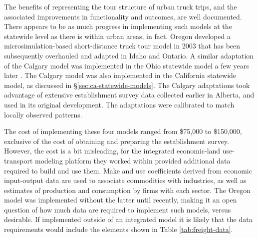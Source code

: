 The benefits of representing the tour structure of urban truck trips, and the associated improvements in functionality and outcomes, are well documented. There appears to be as much progress in implementing such models at the statewide level as there is within urban areas, in fact. Oregon developed a microsimulation-based short-distance truck tour model in 2003 that has been subsequently overhauled and adapted in Idaho and Ontario. A similar adaptation of the Calgary model was implemented in the Ohio statewide model a few years later \citep{gliebe07}. The Calgary model was also implemented in the California statewide model, as discussed in \S\ref{sec:ca-statewide-models}. The Calgary adaptations took advantage of extensive establishment survey data collected earlier in Alberta, and used in its original development. The adaptations were calibrated to match locally observed patterns.

The cost of implementing these four models ranged from \$75,000 to \$150,000, exclusive of the cost of obtaining and preparing the establishment survey. However, the cost is a bit misleading, for the integrated economic-land use-transport modeling platform they worked within provided additional data required to build and use them. Make and use coefficients derived from economic input-output data are used to associate commodities with industries, as well as estimates of production and consumption by firms with each sector. The Oregon model was implemented without the latter until recently, making it an open question of how much data are required to implement such models, versus desirable. If implemented outside of an integrated model it is likely that the data requirements would include the elements shown in Table \ref{tab:freight-data}.

